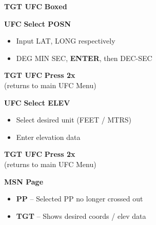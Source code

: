 \documentclass[fontInter]{TechCheck}
\begin{document}
\begin{tablenumerate}
{\begin{subenumerate}
			\item \textbf{TGT UFC} \dotfill \textbf{Boxed}
			\item \textbf{UFC} \dotfill \textbf{Select POSN}
			\begin{itemize}
				\item Input LAT, LONG respectively
				\item DEG MIN SEC, \textbf{ENTER}, then DEC-SEC
			\end{itemize}
			\item \textbf{TGT UFC} \dotfill \textbf{Press 2x} \\
			\hfill (returns to main UFC Menu)
			\item \textbf{UFC} \dotfill \textbf{Select ELEV}
			\begin{itemize}
				\item Select desired unit (FEET / MTRS)
				\item Enter elevation data
			\end{itemize}
			\item \textbf{TGT UFC} \dotfill \textbf{Press 2x} \\
			\hfill (returns to main UFC Menu)
			\item \textbf{MSN Page}
			\begin{itemize}
				\item \textbf{PP} -- Selected PP no longer crossed out
				\item \textbf{TGT} -- Shows desired coords / elev data 	
			\end{itemize}
		\end{subenumerate}}
	\end{tablenumerate}

	\clearpage
\end{document}
